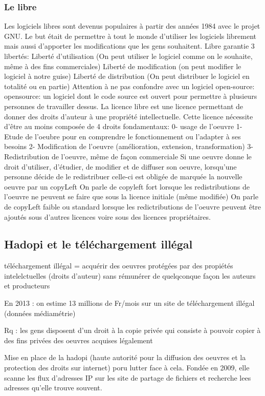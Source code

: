 \documentclass{article}
\begin{document}
\subsubsection{Le libre}
Les logiciels libres sont devenus populaires à partir des années 1984 avec le projet GNU.
Le but était de permettre à tout le monde d'utiliser les logiciels librement mais aussi d'apporter les modifications que les gens souhaitent.
Libre garantie 3 libertés: Liberté d'utilisation (On peut utiliser le logiciel comme on le souhaite, même à des fins commerciales)
Liberté de modification (on peut modifier le logiciel à notre guise)
Liberté de distribution (On peut distribuer le logiciel en totalité ou en partie)
Attention à ne pas confondre avec un logiciel open-source:
opensource: un logiciel dont le code source est ouvert pour permettre à plusieurs personnes de travailler dessus.
La licence libre est une licence permettant de donner des droits d'auteur à une propriété intellectuelle.
Cette licence nécessite d'être au moins composée de 4 droits fondamentaux: 
0- usage de l'oeuvre
1- Etude de l'oeubre pour en comprendre le fonctionnement ou l'adapter à ses besoins
2- Modification de l'oeuvre (amélioration, extension, transformation)
3- Redistribution de l'oeuvre, même de façon commerciale
Si une oeuvre donne le droit d'utiliser, d'étudier, de modifier et de diffuser son oeuvre, 
lorsqu'une personne décide de le redistribuer celle-ci est obligée de marquée la nouvelle oeuvre par un copyLeft
On parle de copyleft fort lorsque les redistributions de l'oeuvre ne peuvent se faire que sous la licence initiale (même modifiée)
On parle de copyLeft faible ou standard lorsque les redictributions de l'oeuvre peuvent être ajoutés sous d'autres licences voire sous des licences propriétaires.

\subsection{Hadopi et le téléchargement illégal}
téléchargement illégal = acquérir des oeuvres protégées par des propiétés intelelctuelles (droits d'auteur) sans rémunérer de quelqconque façon les auteurs et producteurs

En 2013 : on estime 13 millions de Fr/mois sur un site de téléchargement illégal (données médiamétrie)

Rq : les gens disposent d'un droit à la copie privée qui consiste à pouvoir copier à des fins privées des oeuvres acquises légalement

Mise en place de la hadopi (haute autorité pour la diffusion des oeuvres et la protection des droits sur internet) poru lutter face à cela. Fondée en 2009, elle scanne les flux d'adresses IP sur les site de partage de fichiers et recherche lees adresses qu'elle trouve souvent. 
\end{document}

